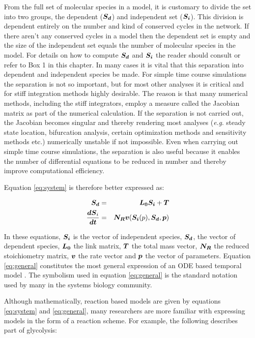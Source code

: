 From the full set of molecular species in a model, it is customary to
divide the set into two groups, the dependent ($\mbox{\boldmath $S_d$}$) and independent
set ($\mbox{\boldmath $S_i$}$). This division is dependent entirely on the number and kind
of conserved cycles in the network. If there aren't any conserved cycles
in a model then the dependent set is empty and the size of the
independent set equals the number of molecular species in the model. For
details on how to compute $\mbox{\boldmath $S_d$}$ and $\mbox{\boldmath $S_i$}$ the reader should consult
\autocite{Sauro:ICycles2004} or refer to Box 1 in this chapter. In many
cases it is vital that this separation into dependent and independent
species be made. For simple time course simulations the separation is
not so important, but for most other analyses it is critical and for
stiff integration methods highly desirable. The reason is that many
numerical methods, including the stiff integrators, employ a measure
called the Jacobian matrix as part of the numerical calculation. If the
separation is not carried out, the Jacobian becomes singular and thereby
rendering most analyses (\emph{e.g.} steady state location, bifurcation
analysis, certain optimization methods and sensitivity methods etc.)
numerically unstable if not impossible. Even when carrying out simple
time course simulations, the separation is also useful because it
enables the number of differential equations to be reduced in number and
thereby improve computational efficiency.

Equation \ref{eq:system} is therefore better expressed as:

\begin{eqnarray} \label{eq:general}
        \mbox{\boldmath $S_d$} &=& \mbox{\boldmath $L_0$} \mbox{\boldmath $S_i$} + \mbox{\boldmath $T$} \nonumber \\
        \mbox{$\displaystyle \frac{\mbox{\boldmath $dS$}_i}{\mbox{\boldmath $dt$}}$} &=& \mbox{\boldmath $N_R$} \mbox{\boldmath $v$} (\mbox{\boldmath $S_i$} (p), \mbox{\boldmath $S_d$}, \mbox{\boldmath $p$}) 
\end{eqnarray}

In these equations, $\mbox{\boldmath $S_i$}$ is the vector of independent species, $\mbox{\boldmath $S_d$}$,
the vector of dependent species, $\mbox{\boldmath $L_0$}$ the link matrix, $\mbox{\boldmath $T$}$ the total
mass vector, $\mbox{\boldmath $N_R$}$ the reduced stoichiometry matrix, $\mbox{\boldmath $v$}$ the rate
vector and $\mbox{\boldmath $p$}$ the vector of parameters. Equation \ref{eq:general}
constitutes the most general expression of an ODE based temporal model
\autocite{hofmeyr-nutshell}\autocite{Schuster:Book}. The symbolism used
in equation \ref{eq:general} is the standard notation used by many in
the systems biology community.

Although mathematically, reaction based models are given by equations
\ref{eq:system} and \ref{eq:general}, many researchers are more familiar
with expressing models in the form of a reaction scheme. For example,
the following describes part of glycolysis:

